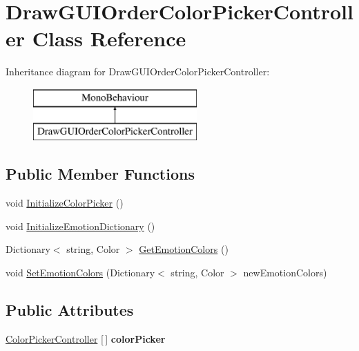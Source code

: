 \hypertarget{class_draw_g_u_i_order_color_picker_controller}{}\section{Draw\+G\+U\+I\+Order\+Color\+Picker\+Controller Class Reference}
\label{class_draw_g_u_i_order_color_picker_controller}
Inheritance diagram for Draw\+G\+U\+I\+Order\+Color\+Picker\+Controller\+:\begin{figure}[H]
\begin{center}
\leavevmode
\includegraphics[height=2.000000cm]{class_draw_g_u_i_order_color_picker_controller}
\end{center}
\end{figure}
\subsection*{Public Member Functions}
\begin{DoxyCompactItemize}
\item 
void \mbox{\hyperlink{class_draw_g_u_i_order_color_picker_controller_ac09032a5c822e5e92e2ee6affbe211e2}{Initialize\+Color\+Picker}} ()
\item 
void \mbox{\hyperlink{class_draw_g_u_i_order_color_picker_controller_a2826d41e7da244fa2725e024ec63656f}{Initialize\+Emotion\+Dictionary}} ()
\item 
Dictionary$<$ string, Color $>$ \mbox{\hyperlink{class_draw_g_u_i_order_color_picker_controller_a6fc89f89616c9335cac066a5a92ca88c}{Get\+Emotion\+Colors}} ()
\item 
void \mbox{\hyperlink{class_draw_g_u_i_order_color_picker_controller_a5afb3719ebda5e3f86b3106c23c6591b}{Set\+Emotion\+Colors}} (Dictionary$<$ string, Color $>$ new\+Emotion\+Colors)
\end{DoxyCompactItemize}
\subsection*{Public Attributes}
\begin{DoxyCompactItemize}
\item 
\mbox{\label{class_draw_g_u_i_order_color_picker_controller_a3f6e6a837c6acf8f8f8672b48ef61cb7}} 
\mbox{\hyperlink{class_color_picker_controller}{Color\+Picker\+Controller}} \mbox{[}$\,$\mbox{]} {\bfseries color\+Picker}
\end{DoxyCompactItemize}
